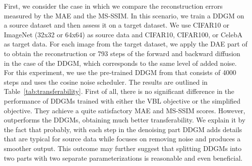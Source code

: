 \begin{table}[t]
  \centering
  \caption{Reconstruction errors measured by MAE~($\downarrow$), MS-SSIM~($\uparrow$) for images noised with $\beta_1=0.1$. \\
  	*To evaluate models trained on CIFAR10, we downscale CelebA to $32\times32$. \textbf{Best results in bold.}}
  \vskip -5pt
  \label{tab:transferability}
\end{table}

First, we consider the case in which we compare the reconstruction errors measured by the MAE and the MS-SSIM. In this scenario, we train a DDGM on a source dataset and then assess it on a target dataset. We use CIFAR10 or ImageNet (32x32 or 64x64) as source data and CIFAR10, CIFAR100, or CelebA as target data. For each image from the target dataset, we apply the DAE part of \ours{} to obtain the reconstruction or 793 steps of the forward and backward diffusion in the case of the DDGM, which corresponds to the same level of added noise. For this experiment, we use the pre-trained DDGM from \citet{nichol2021improved} that consists of 4000 steps and uses the cosine noise scheduler. The results are outlined in Table~\ref{tab:transferability}. First of all, there is no significant difference in the performance of DDGMs trained with either the VBL objective or the simplified objective. They achieve a quite satisfactory MAE and MS-SSIM scores. However, \ours{} outperforms the DDGMs, obtaining much better transferability. We explain it by the fact that probably, with each step in the denoising part DDGM adds details that are typical for source data while \ours{} focuses on removing noise and produces a smoother output. This outcome may further suggest that splitting DDGMs into two parts with two separate parameterizations is reasonable and even beneficial.


